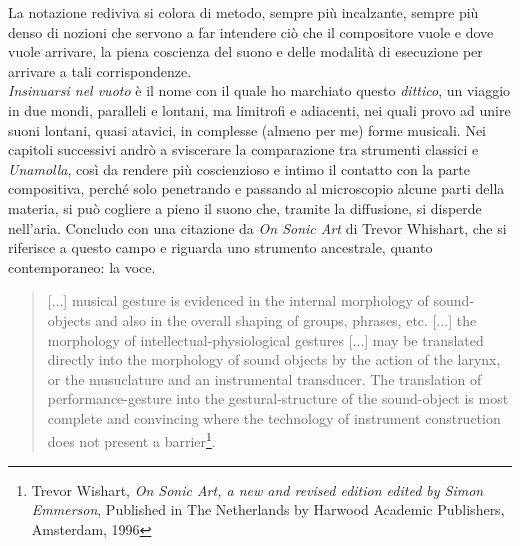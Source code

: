 La notazione rediviva si colora di metodo, sempre più incalzante, sempre più denso di nozioni che servono a far intendere ciò che il compositore vuole e dove vuole arrivare, la piena coscienza del suono e delle modalità di esecuzione per arrivare a tali corrispondenze. \\
\textit{Insinuarsi nel vuoto} è il nome con il quale ho marchiato questo \textit{dittico}, un viaggio in due mondi, paralleli e lontani, ma limitrofi e adiacenti, nei quali provo ad unire suoni lontani, quasi atavici, in complesse (almeno per me) forme musicali. Nei capitoli successivi andrò a sviscerare la comparazione tra strumenti classici e \textit{Unamolla}, così da rendere più coscienzioso e intimo il contatto con la parte compositiva, perché solo penetrando e passando al microscopio alcune parti della materia, si può cogliere a pieno il suono che, tramite la diffusione, si disperde nell'aria. Concludo con una citazione da \textit{On Sonic Art} di Trevor Whishart, che si riferisce a questo campo e riguarda uno strumento ancestrale, quanto contemporaneo: la voce.

\begin{quotation}
[...] musical gesture is evidenced in the internal morphology of sound-objects and also in the overall shaping of groups, phrases, etc. [...] the morphology of intellectual-physiological gestures [...] may be translated directly into the morphology of sound objects by the action of the larynx, or the musuclature and an instrumental transducer. The translation of performance-gesture into the gestural-structure of the sound-object is most complete and convincing where the technology of instrument construction does not present a barrier\footnote{Trevor Wishart, \textit{On Sonic Art, a new and revised edition edited by Simon Emmerson}, Published in The Netherlands by Harwood Academic Publishers, Amsterdam, 1996}.
\end{quotation}





